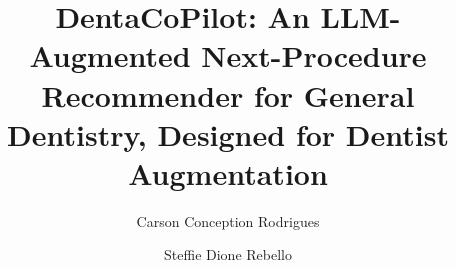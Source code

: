 \documentclass[preprint,authoryear,1p,12pt]{elsarticle}
\begin{document}
\begin{frontmatter}

\title{DentaCoPilot: An LLM-Augmented Next-Procedure Recommender for General Dentistry, Designed for Dentist Augmentation}

\author[celabe]{Carson Conception Rodrigues}
\author[kle]{Steffie Dione Rebello}

\address[celabe]{CELABE, Research Division \\ Email: \href{mailto:carson@celabe.com}{\texttt{carson@celabe.com}}}
\address[kle]{KLE Vishwanath Katti Institute of Dental Sciences, Belgaum, India \\ Email: \href{mailto:steffie1619@gmail.com}{\texttt{steffie1619@gmail.com}}}



\end{frontmatter}
\end{document}
